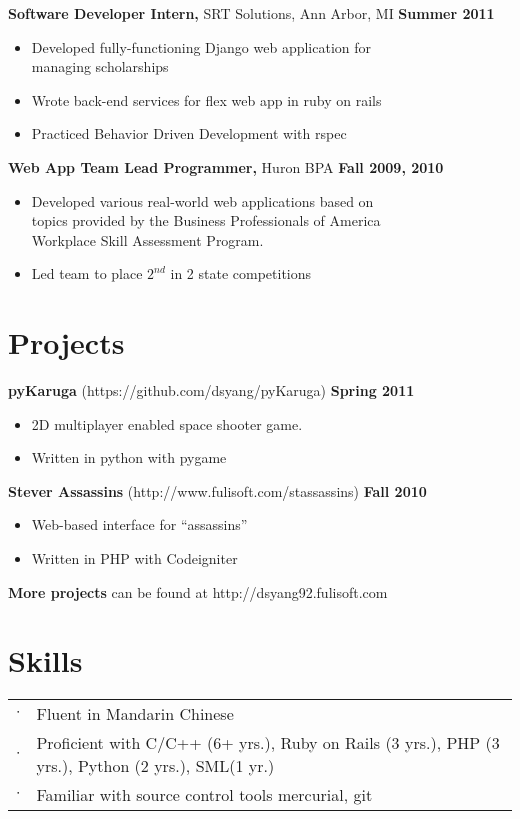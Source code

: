 \documentclass[sectioned]{dsyangres}
\begin{document}
\begin{resume}
\textbf{Software Developer Intern,}
  SRT Solutions, Ann Arbor, MI \hfill \textbf{Summer 2011}

  \begin{itemize} \itemsep -2pt
    \item Developed fully-functioning Django web application for\\
      managing scholarships
    \item Wrote back-end services for flex web app in ruby
      on rails
    \item Practiced Behavior Driven Development with rspec
  \end{itemize}

\textbf{Web App Team Lead Programmer, }
  Huron BPA \hfill \textbf{Fall 2009, 2010}
  \begin{itemize} \itemsep -2pt %
    \item Developed various real-world web applications based on\\
      topics provided by the Business Professionals of America \\
      Workplace Skill Assessment Program.
    \item Led team to place $2^{nd}$ in 2 state competitions
  \end{itemize}



\section{Projects}

\textbf{pyKaruga} (https://github.com/dsyang/pyKaruga) \hfill \textbf{Spring 2011}
  \begin{itemize} \itemsep -2pt
    \item 2D multiplayer enabled space shooter game.
    \item Written in python with pygame
  \end{itemize}

\textbf{Stever Assassins} (http://www.fulisoft.com/stassassins)
 \hfill \textbf{Fall 2010}
  \begin{itemize} \itemsep -2pt
    \item Web-based interface for ``assassins''
    \item Written in PHP with Codeigniter
  \end{itemize}

\textbf{More projects} can be found at http://dsyang92.fulisoft.com

\section{Skills}
  \begin{tabular}{c p{3.5in}}
    $\cdot$ & Fluent in Mandarin Chinese \\
    $\cdot$ & Proficient with C/C++ (6+ yrs.), Ruby on Rails (3 yrs.), PHP (3
       yrs.), Python (2 yrs.), SML(1 yr.)\\
    $\cdot$ & Familiar with source control tools mercurial, git\\
  \end{tabular}



\end{resume}
\end{document}

